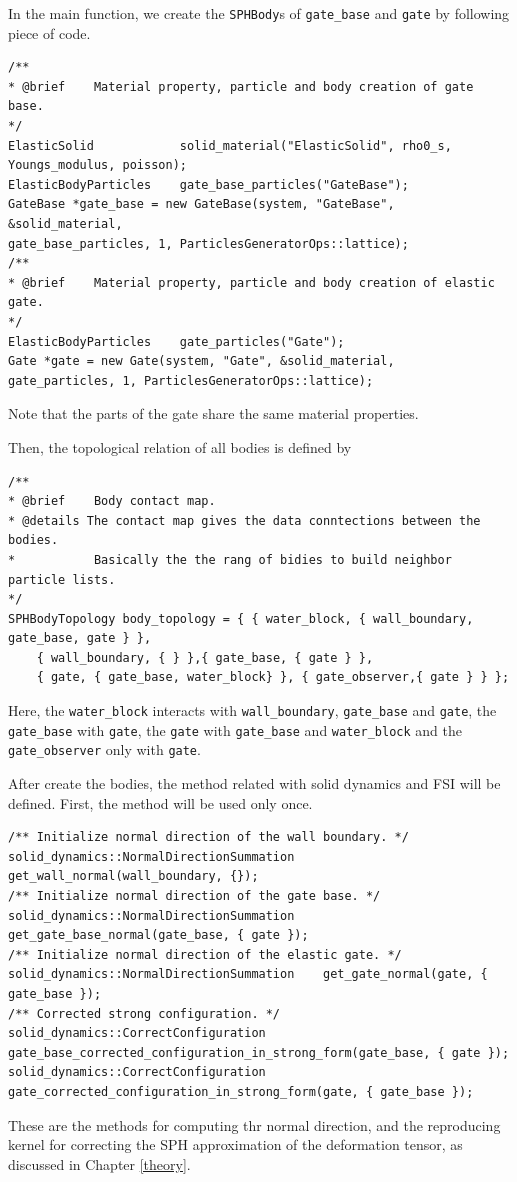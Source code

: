 \documentclass[12pt, a4paper,onecolumn]{article}
\begin{document}
In the main function, we create the \texttt{SPHBody}s of \texttt{gate\_base} and \texttt{gate} by following piece of code.  
%
\begin{lstlisting}[basicstyle=\ttfamily\footnotesize]
	/**
* @brief 	Material property, particle and body creation of gate base.
*/
ElasticSolid 			solid_material("ElasticSolid", rho0_s, Youngs_modulus, poisson);
ElasticBodyParticles 	gate_base_particles("GateBase");
GateBase *gate_base = new GateBase(system, "GateBase", &solid_material,
gate_base_particles, 1, ParticlesGeneratorOps::lattice);
/**
* @brief 	Material property, particle and body creation of elastic gate.
*/
ElasticBodyParticles 	gate_particles("Gate");
Gate *gate = new Gate(system, "Gate", &solid_material,
gate_particles, 1, ParticlesGeneratorOps::lattice);
\end{lstlisting}
%
Note that the parts of the gate share the same material properties.

Then, the topological relation of all bodies is defined by
%
\begin{lstlisting}[basicstyle=\ttfamily\footnotesize]
	/**
* @brief 	Body contact map.
* @details The contact map gives the data conntections between the bodies.
* 			Basically the the rang of bidies to build neighbor particle lists.
*/
SPHBodyTopology body_topology = { { water_block, { wall_boundary, gate_base, gate } },
	{ wall_boundary, { } },{ gate_base, { gate } },
	{ gate, { gate_base, water_block} }, { gate_observer,{ gate } } };
\end{lstlisting}
%
Here, the \texttt{water\_block} interacts with \texttt{wall\_boundary}, \texttt{gate\_base} and \texttt{gate}, 
the \texttt{gate\_base} with \texttt{gate}, the \texttt{gate} with \texttt{gate\_base} and \texttt{water\_block} and the \texttt{gate\_observer} only with \texttt{gate}. 

After create the bodies, the method related with solid dynamics and FSI will be defined.
First, the method will be used only once.
%
\begin{lstlisting}[basicstyle=\ttfamily\footnotesize]
	/** Initialize normal direction of the wall boundary. */
solid_dynamics::NormalDirectionSummation 	get_wall_normal(wall_boundary, {});
/** Initialize normal direction of the gate base. */
solid_dynamics::NormalDirectionSummation 	get_gate_base_normal(gate_base, { gate });
/** Initialize normal direction of the elastic gate. */
solid_dynamics::NormalDirectionSummation 	get_gate_normal(gate, { gate_base });
/** Corrected strong configuration. */
solid_dynamics::CorrectConfiguration 		gate_base_corrected_configuration_in_strong_form(gate_base, { gate });
solid_dynamics::CorrectConfiguration 		gate_corrected_configuration_in_strong_form(gate, { gate_base });
\end{lstlisting}
%
These are the methods for computing thr normal direction, 
and the reproducing kernel for correcting the SPH approximation of the deformation tensor,
as discussed in Chapter \ref{theory}.
\end{document}
